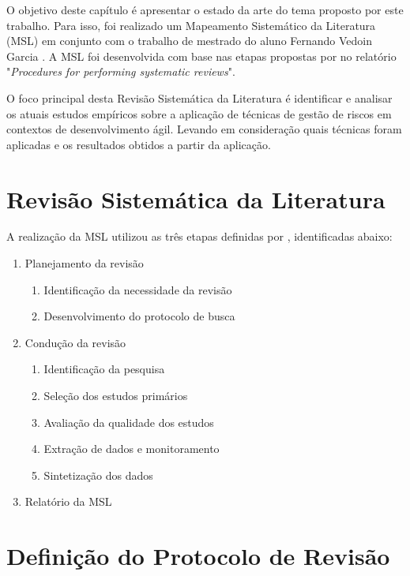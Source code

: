 \documentclass[
    12pt,       %
    openright,      %
    twoside,      %
    a4paper,      %
    english,      %
    french,       %
    spanish,      %
    brazil,       %
    ]{abntex2}
\begin{document}
O objetivo deste capítulo é apresentar o estado da arte do tema proposto por este trabalho. Para isso, foi realizado um Mapeamento Sistemático da Literatura (MSL) em conjunto com o trabalho de mestrado do aluno Fernando Vedoin Garcia \cite{GARCIA:2021}. A MSL foi desenvolvida com base nas etapas propostas por  no relatório "\textit{Procedures for performing systematic reviews}". 

O foco principal desta Revisão Sistemática da Literatura é identificar e analisar os atuais estudos empíricos sobre a aplicação de técnicas de gestão de riscos em contextos de desenvolvimento ágil. Levando em consideração quais técnicas foram aplicadas e os resultados obtidos a partir da aplicação.

\section{Revisão Sistemática da Literatura}

A realização da MSL utilizou as três etapas definidas por , identificadas abaixo: 

\begin{enumerate}
    \item Planejamento da revisão
        \begin{enumerate}
            \item Identificação da necessidade da revisão
            \item Desenvolvimento do protocolo de busca
        \end{enumerate}
    \item Condução da revisão
        \begin{enumerate}
            \item Identificação da pesquisa
            \item Seleção dos estudos primários
            \item Avaliação da qualidade dos estudos
            \item Extração de dados e monitoramento
            \item Sintetização dos dados
        \end{enumerate}
    \item Relatório da MSL
\end{enumerate}

\section{Definição do Protocolo de Revisão}
\end{document}
